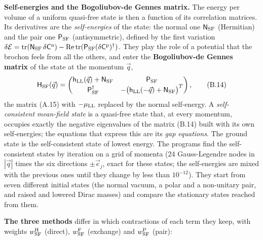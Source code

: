 \documentclass[
  10pt,
]{article}
\begin{document}
\textbf{Self-energies and the Bogoliubov-de Gennes matrix.} The energy
per volume of a uniform quasi-free state is then a function of its
correlation matrices. Its derivatives are the \emph{self-energies} of
the state: the normal one \(\mathsf N_{\rm SF}\) (Hermitian) and the
pair one \(\mathsf P_{\rm SF}\) (antisymmetric), defined by the first
variation
\(\delta\mathcal E=\mathrm{tr}(\mathsf N_{\rm SF}\,\delta\mathsf C^{\rm n})-\mathrm{Re}\,\mathrm{tr}(\mathsf P_{\rm SF}(\delta\mathsf C^{\rm p})^\dagger)\).
They play the role of a potential that the brochon feels from all the
others, and enter the \textbf{Bogoliubov-de Gennes matrix} of the state
at the momentum \(\vec q\),
\[\mathsf H_{\rm SF}(\vec q)=\begin{pmatrix}\mathsf h_{\rm LL}(\vec q)+\mathsf N_{\rm SF}&\mathsf P_{\rm SF}\\\mathsf P_{\rm SF}^\dagger&-\big(\mathsf h_{\rm LL}(-\vec q)+\mathsf N_{\rm SF}\big)^T\end{pmatrix},\tag{B.14}\]
the matrix (A.15) with \(-\mu_{\rm LL}\) replaced by the normal
self-energy. A \emph{self-consistent mean-field state} is a quasi-free
state that, at every momentum, occupies exactly the negative eigenvalues
of the matrix (B.14) built with its own self-energies; the equations
that express this are its \emph{gap equations}. The ground state is the
self-consistent state of lowest energy. The programs find the
self-consistent states by iteration on a grid of momenta (24
Gauss-Legendre nodes in \(|\vec q|\) times the six directions
\(\pm\vec e_j\), exact for these states; the self-energies are mixed
with the previous ones until they change by less than \(10^{-12}\)).
They start from seven different initial states (the normal vacuum, a
polar and a non-unitary pair, and raised and lowered Dirac masses) and
compare the stationary states reached from them.

\textbf{The three methods} differ in which contractions of each term
they keep, with weights \(w^{\rm H}_{\rm SF}\) (direct),
\(w^{\rm F}_{\rm SF}\) (exchange) and \(w^{\rm P}_{\rm SF}\) (pair):
\end{document}
